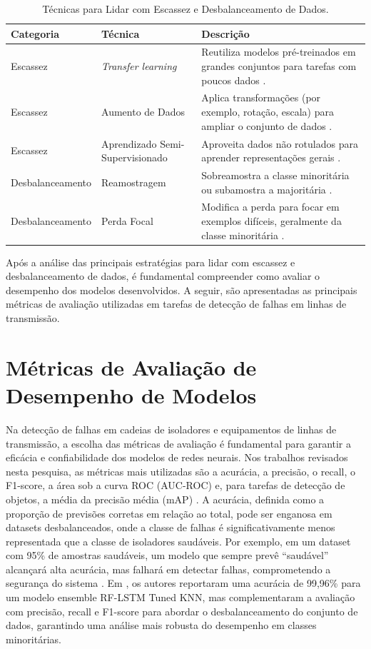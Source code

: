 \begin{table}[H]
\centering
\caption{Técnicas para Lidar com Escassez e Desbalanceamento de Dados.}
\label{tab:tecnicas_escassez_desbalanceamento_datasets}
\begin{tabular}{|p{3.5cm}|p{3.5cm}|p{7.5cm}|}
\hline
\textbf{Categoria} & \textbf{Técnica} & \textbf{Descrição} \\
\hline
Escassez & \textit{Transfer learning} & Reutiliza modelos pré-treinados em grandes conjuntos para tarefas com poucos dados \cite{pan2010survey}. \\
\hline
Escassez & Aumento de Dados & Aplica transformações (por exemplo, rotação, escala) para ampliar o conjunto de dados \cite{shorten2019survey}. \\
\hline
Escassez & Aprendizado Semi-Supervisionado & Aproveita dados não rotulados para aprender representações gerais \cite{van2020survey}. \\
\hline
Desbalanceamento & Reamostragem & Sobreamostra a classe minoritária ou subamostra a majoritária \cite{johnson2019survey}. \\
\hline
Desbalanceamento & Perda Focal & Modifica a perda para focar em exemplos difíceis, geralmente da classe minoritária \cite{lin2017focal}. \\
\hline
\end{tabular}
\end{table}

Após a análise das principais estratégias para lidar com escassez e desbalanceamento de dados, é fundamental compreender como avaliar o desempenho dos modelos desenvolvidos. A seguir, são apresentadas as principais métricas de avaliação utilizadas em tarefas de detecção de falhas em linhas de transmissão.

\section{Métricas de Avaliação de Desempenho de Modelos}

Na detecção de falhas em cadeias de isoladores e equipamentos de linhas de transmissão, a escolha das métricas de avaliação é fundamental para garantir a eficácia e confiabilidade dos modelos de redes neurais. Nos trabalhos revisados nesta pesquisa, as métricas mais utilizadas são a acurácia, a precisão, o recall, o F1-score, a área sob a curva ROC (AUC-ROC) e, para tarefas de detecção de objetos, a média da precisão média (mAP) \cite{zheng2022improved,alam2025robust,peng2023edf}. A acurácia, definida como a proporção de previsões corretas em relação ao total, pode ser enganosa em datasets desbalanceados, onde a classe de falhas é significativamente menos representada que a classe de isoladores saudáveis. Por exemplo, em um dataset com 95\% de amostras saudáveis, um modelo que sempre prevê ``saudável'' alcançará alta acurácia, mas falhará em detectar falhas, comprometendo a segurança do sistema \cite{he2009learning}. Em , os autores reportaram uma acurácia de 99,96\% para um modelo ensemble RF-LSTM Tuned KNN, mas complementaram a avaliação com precisão, recall e F1-score para abordar o desbalanceamento do conjunto de dados, garantindo uma análise mais robusta do desempenho em classes minoritárias.

